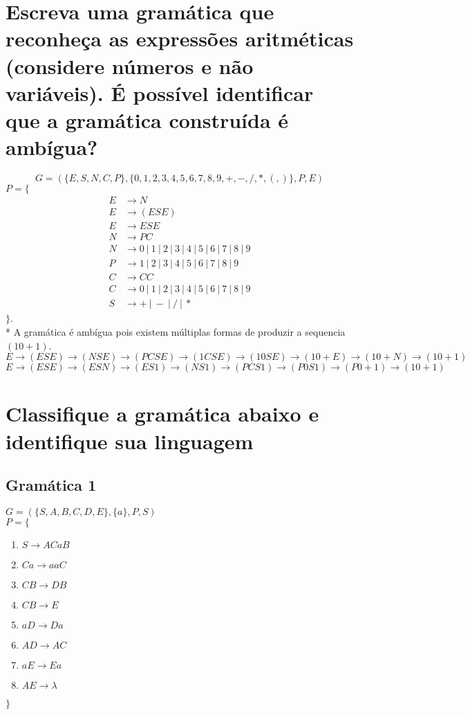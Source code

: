 \documentclass{article}
\begin{document}
\section{Escreva uma gramática que reconheça as expressões aritméticas (considere números e não variáveis). É possível identificar que a gramática construída é ambígua?}
$$G = (\{E, S, N, C, P\}, \{0, 1, 2, 3, 4, 5, 6, 7, 8, 9, +, -, /, *, (, )\}, P, E)$$
$P = \{$
\begin{align*}
 E &\rightarrow N\\
 E &\rightarrow (ESE)\\
 E &\rightarrow ESE\\
 N &\rightarrow PC\\
 N &\rightarrow 0\ | \ 1\ | \ 2\ | \ 3\ | \ 4\ | \ 5\ | \ 6\ | \ 7\ | \ 8\ | \ 9\\
 P &\rightarrow 1\ | \ 2\ | \ 3\ | \ 4\ | \ 5\ | \ 6\ | \ 7\ | \ 8\ | \ 9\\
 C &\rightarrow CC\\
 C &\rightarrow 0\ | \ 1\ | \ 2\ | \ 3\ | \ 4\ | \ 5\ | \ 6\ | \ 7\ | \ 8\ | \ 9\\
 S &\rightarrow +\ | \ -\ | \ /\ | \ *
\end{align*}
$\}$.\\*
A gramática é ambígua pois existem múltiplas formas de produzir a sequencia $(10 + 1)$.\\
$E \rightarrow (ESE) \rightarrow (NSE) \rightarrow (PCSE) \rightarrow (1CSE) \rightarrow (10SE) \rightarrow (10+E) \rightarrow (10+N) \rightarrow (10+1)$\\
$E \rightarrow (ESE) \rightarrow (ESN) \rightarrow (ES1) \rightarrow (NS1) \rightarrow (PCS1) \rightarrow (P0S1) \rightarrow (P0+1) \rightarrow (10+1)$


\newpage
\section{Classifique a gramática abaixo e identifique sua linguagem}


\subsection{Gramática 1}
$G= ( \{ S,A,B,C,D,E \} , \{ a \} , P,S )$\\
$ P = \{ $
\begin{enumerate}
    \item $S \rightarrow ACaB$
    \item $Ca \rightarrow aaC $
    \item $CB \rightarrow DB$
    \item $CB \rightarrow E$
    \item $aD \rightarrow Da$
    \item $AD \rightarrow AC$
    \item $aE \rightarrow Ea$
    \item $AE \rightarrow \lambda$
\end{enumerate}
$\}$\\
\end{document}
